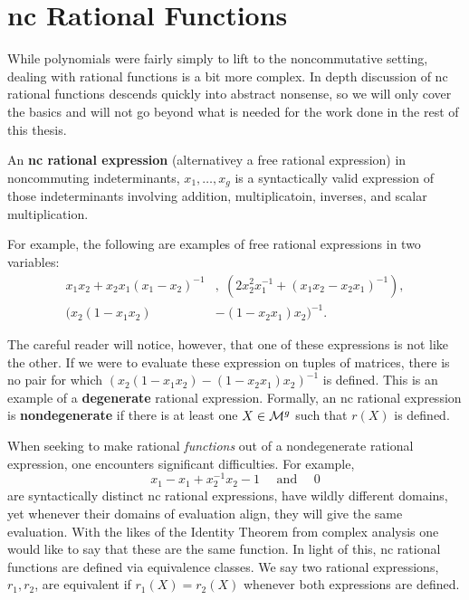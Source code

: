 \section{nc Rational Functions}%
\label{sec:ncrational}

While polynomials were fairly simply to lift to the noncommutative setting,
dealing with rational functions is a bit more complex. In depth discussion of nc
rational functions descends quickly into abstract nonsense, so we will only
cover the basics and will not go beyond what is needed for the work done in the
rest of this thesis.

\begin{definition}%
\label{def:ratexp}
  An \textbf{nc rational expression} (alternativey a free rational expression)
  in noncommuting indeterminants, \(x_1, \dots ,x_g\) is a syntactically valid
  expression of those indeterminants involving addition, multiplicatoin, inverses,
  and scalar multiplication.
\end{definition}

For example, the following are examples of free rational expressions in two
variables:
\begin{equation*}
\begin{split}
  x_1x_2+x_2x_1(x_1-x_2)^{-1} &,\; (2x_2^2x_1^{-1} +(x_1x_2-x_2x_1)^{-1}) ,\\
 (x_2(1-x_1x_2)&-(1-x_2x_1)x_2)^{-1}.
\end{split}
\end{equation*}

The careful reader will notice, however, that one of these expressions is not
like the other. If we were to evaluate these expression on tuples of matrices,
there is no pair for which \((x_2(1-x_1x_2)-(1-x_2x_1)x_2)^{-1}\) is defined.
This is an example of a \textbf{degenerate} rational expression. Formally, an nc
rational expression is \textbf{nondegenerate} if there is at least one
\(X \in \mathcal{M}^{g} \) such that \(r(X)\) is defined.

When seeking to make rational \emph{functions} out of a nondegenerate rational
expression, one encounters significant difficulties. For example,
\[
  x_1-x_1+x_2 ^{-1} x_2-1 \quad \textrm{ and } \quad 0
\]
are syntactically distinct nc rational expressions, have wildly different
domains, yet whenever their domains of evaluation align, they will give the
same evaluation.  With the likes of the Identity Theorem from complex analysis
one would like to say that these are the same function. In light of this, nc
rational functions are defined via equivalence classes. We say two rational
expressions, \(r_1,r_2\), are equivalent if \(r_1(X) = r_2(X)\) whenever both
expressions are defined.

